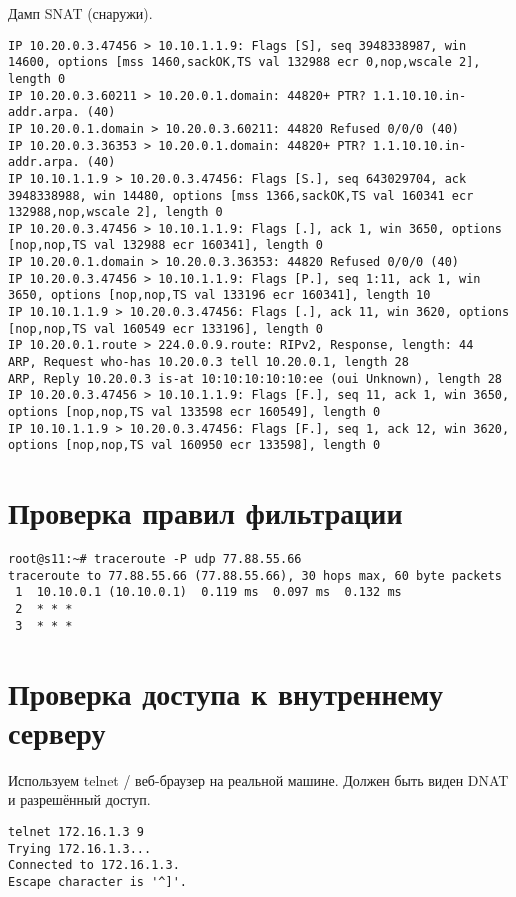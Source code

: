\documentclass[a4paper,12pt]{article}
\begin{document}
Дамп SNAT (снаружи).

\begin{lstlisting}
IP 10.20.0.3.47456 > 10.10.1.1.9: Flags [S], seq 3948338987, win 14600, options [mss 1460,sackOK,TS val 132988 ecr 0,nop,wscale 2], length 0
IP 10.20.0.3.60211 > 10.20.0.1.domain: 44820+ PTR? 1.1.10.10.in-addr.arpa. (40)
IP 10.20.0.1.domain > 10.20.0.3.60211: 44820 Refused 0/0/0 (40)
IP 10.20.0.3.36353 > 10.20.0.1.domain: 44820+ PTR? 1.1.10.10.in-addr.arpa. (40)
IP 10.10.1.1.9 > 10.20.0.3.47456: Flags [S.], seq 643029704, ack 3948338988, win 14480, options [mss 1366,sackOK,TS val 160341 ecr 132988,nop,wscale 2], length 0
IP 10.20.0.3.47456 > 10.10.1.1.9: Flags [.], ack 1, win 3650, options [nop,nop,TS val 132988 ecr 160341], length 0
IP 10.20.0.1.domain > 10.20.0.3.36353: 44820 Refused 0/0/0 (40)
IP 10.20.0.3.47456 > 10.10.1.1.9: Flags [P.], seq 1:11, ack 1, win 3650, options [nop,nop,TS val 133196 ecr 160341], length 10
IP 10.10.1.1.9 > 10.20.0.3.47456: Flags [.], ack 11, win 3620, options [nop,nop,TS val 160549 ecr 133196], length 0
IP 10.20.0.1.route > 224.0.0.9.route: RIPv2, Response, length: 44
ARP, Request who-has 10.20.0.3 tell 10.20.0.1, length 28
ARP, Reply 10.20.0.3 is-at 10:10:10:10:10:ee (oui Unknown), length 28
IP 10.20.0.3.47456 > 10.10.1.1.9: Flags [F.], seq 11, ack 1, win 3650, options [nop,nop,TS val 133598 ecr 160549], length 0
IP 10.10.1.1.9 > 10.20.0.3.47456: Flags [F.], seq 1, ack 12, win 3620, options [nop,nop,TS val 160950 ecr 133598], length 0
\end{lstlisting}

\section{Проверка правил фильтрации}

\begin{lstlisting}
root@s11:~# traceroute -P udp 77.88.55.66
traceroute to 77.88.55.66 (77.88.55.66), 30 hops max, 60 byte packets
 1  10.10.0.1 (10.10.0.1)  0.119 ms  0.097 ms  0.132 ms
 2  * * *
 3  * * *
\end{lstlisting}

\section{Проверка доступа к внутреннему серверу}

Используем telnet / веб-браузер на реальной машине. Должен быть виден DNAT и разрешённый доступ.

\begin{lstlisting}
telnet 172.16.1.3 9
Trying 172.16.1.3...
Connected to 172.16.1.3.
Escape character is '^]'.
\end{lstlisting}
\end{document}
